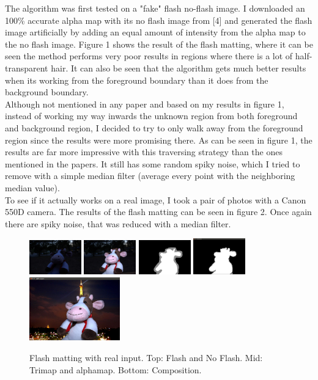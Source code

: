 \documentclass[10pt,letterpaper,twocolumn]{article}
\begin{document}
The algorithm was first tested on a "fake" flash no-flash image. I downloaded an 100\% accurate alpha map with its no flash image from [4] and generated the flash image artificially by adding an equal amount of intensity from the alpha map to the no flash image. Figure 1 shows the result of the flash matting, where it can be seen the method performs very poor results in regions where there is a lot of half-transparent hair. It can also be seen that the algorithm gets much better results when its working from the foreground boundary than it does from the background boundary. 
\\
Although not mentioned in any paper and based on my results in figure 1, instead of working my way inwards the unknown region from both foreground and background region, I decided to try to only walk away from the foreground region since the results were more promising there. As can be seen in figure 1, the results are far more impressive with this traversing strategy than the ones mentioned in the papers. It still has some random spiky noise, which I tried to remove with a simple median filter (average every point with the neighboring median value). 
\\
To see if it actually works on a real image, I took a pair of photos with a Canon 550D camera. The results of the flash matting can be seen in figure 2. Once again there are spiky noise, that was reduced with a median filter.
\begin{figure}[h!]

  \centering
    \includegraphics[width=0.2\textwidth]{cownoflash.jpg}
    \includegraphics[width=0.2\textwidth]{cowflash.jpg}
        \includegraphics[width=0.2\textwidth]{trimap.png}
            \includegraphics[width=0.2\textwidth]{cowalpha.png}
           \includegraphics[width=0.35\textwidth]{cowparis.png}
      \caption{Flash matting with real input. Top: Flash and No Flash. Mid: Trimap and alphamap. Bottom: Composition.}
      \label{fig:cow}
\end{figure}
\end{document}
